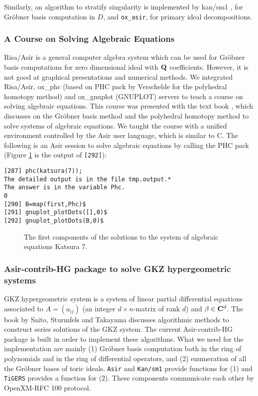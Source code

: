 Similarly, 
an algorithm to stratify singularity 
\cite{oaku-advance}
is implemented by
kan/sm1 \cite{kan}, for Gr\"obner basis computation in $D$, and
{\tt ox\_asir}, for primary ideal decompositions.

\subsubsection{A Course on Solving Algebraic Equations}

Risa/Asir \cite{asir} is a general computer algebra system
which can be used for Gr\"obner basis computations for zero dimensional ideal
with ${\bf Q}$ coefficients.
However, it is not good at graphical presentations and
numerical methods.
We integrated Risa/Asir, ox\_phc (based on PHC pack by Verschelde \cite{phc}
for the polyhedral homotopy method) and
ox\_gnuplot (GNUPLOT) servers
to teach a course on solving algebraic equations.
This course was presented with the text book \cite{CLO},
which discusses 
on the Gr\"obner basis method and the polyhedral homotopy method
to solve systems of algebraic equations.
We taught the course
with a unified environment
controlled by the Asir user language, which is similar to C.
The following is an Asir session to solve algebraic equations by calling
the PHC pack (Figure \ref{katsura} is the output of {\tt [292]}):
\begin{verbatim}
[287] phc(katsura(7));
The detailed output is in the file tmp.output.*
The answer is in the variable Phc.
0
[290] B=map(first,Phc)$
[291] gnuplot_plotDots([],0)$
[292] gnuplot_plotDots(B,0)$
\end{verbatim}

\begin{figure}[htbp]
\epsfxsize=8.5cm
\caption{The first components of the solutions to the system of algebraic equations Katsura 7.}
\label{katsura}
\end{figure}

\subsubsection{Asir-contrib-HG package to solve GKZ hypergeometric systems}

GKZ hypergeometric system is a system of linear partial differential
equations associated to $A=(a_{ij})$  
(an integer $d\times n$-matrix of rank $d$)
and $\beta \in {\bf C}^d$.
The book by Saito, Sturmfels and Takayama \cite{sst-book}
discusses algorithmic methods to construct series solutions of the GKZ
system.
The current Asir-contrib-HG package is built in order to implement
these algorithms.
What we need for the implementation are mainly
(1) Gr\"obner basis computation both in the ring of polynomials
and in the ring of differential operators,
and
(2) enumeration of all the Gr\"obner bases of toric ideals.
{\tt Asir} and {\tt Kan/sm1} provide functions for (1) and
{\tt TiGERS} provides a function for (2).
These components communicate each other by OpenXM-RFC 100 protocol.

